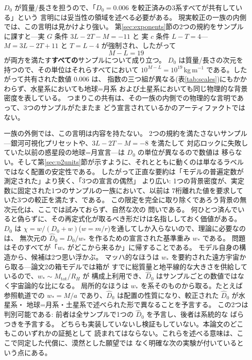 \documentclass[a4paper,10pt,twocolumn]{ltjsarticle}
\begin{document}
$D_0$ が質量/長さを担うので、「$D_0=0.006$ を較正済みの3系すべてが共有している」という
言明には妥当性の領域を述べる必要がある。
現実較正の一族の内側では、この言明は見かけより強い。
第\ref{sec:exponents}節の2つの規約をサンプルに課すと---実 $G$ 条件 $3L-2T-M=-11$ と
実 $c$ 条件 $L-T=4$---$M=3L-2T+11$ と $T=L-4$ が強制され、したがって
\begin{equation}
  M-L = 19
  \label{eq:ML}
\end{equation}
が両方を満たす\textbf{すべての}サンプルについて成り立つ。
$D_0$ は質量/長さの次元を持つので、その単位はそれらすべてにおいて
$10^{M-L}=10^{19}$\,kg\,m$^{-1}$ である。したがって共有された数値 $0.006$ は、
指数の三つ組が異なる(表\ref{tab:scales})にもかかわらず、水星系においても地球=月系
および土星系においても同じ物理的な背景密度を表している。
つまりこの共有は、その一族の内側での物理的な言明であって、3つのサンプルがたまたま
どう宣言されているかのアーティファクトではない。

一族の外側では、この言明は内容を持たない。
2つの規約を満たさないサンプル---銀河可視化プリセットや、$3L-2T-M=-8$ を満たして
対応ロックに失敗していた以前の惑星段の地球=月宣言---は $D_0$ の単位が異なるので数値は
移らない。そして第\ref{sec:p2units}節が示すように、それとともに動くのは単なるラベル
ではなく配置の安定性である。
したがって正直な要約は「モデルの普遍定数が測定された」より狭く、「3つの宣言の偶然」
より広い: 1つの背景密度が、実定数に固定された1つのサンプルの一族において、以前は
7桁離れた値を要求していた3つの較正を満たす、である。
この限定を完全に取り除くであろう背景の無次元化は、ここでは試みておらず、自然な次の
問いである。
何ひとつ済んでいると偽らずに、その再定式化が取るべき形だけは名指ししておく価値がある。
$D_0$ は $\chi=w/(D_0+w)$($w=m/r$)を通してしか入らないので、理論に必要なのは、
無次元の $\hat D_0=D_0/w_{\ast}$ を作るための宣言された基準重み $w_{\ast}$ である。
問題はそのすべてが「$w_{\ast}$ がどこから来るか」に帰することである。
モデル自身の構造から、候補は2つ思い浮かぶ。
マッハ的なほうは $w_{\ast}$ を要約された遠方宇宙から取る---論文2の箱モデルでは箱が
すでに総質量と地平線的な大きさを供給しているので、$w_{\ast}\sim M_{\mathrm{tot}}/R_{H}$ が
構成上利用でき、$\hat D_0$ はサンプルごとの数値ではなく宇宙論的な比になる。
局所的なほうは $w_{\ast}$ を系そのものから取る。たとえば参照軌道での
$w_{\ast}=M/a$ であり、$\hat D_0$ は配置の性質になり、較正された $\hat D_0$ が水星系・
地球=月系・土星系で述べられた形で異なることを予言する。
この2つは判別可能である: 前者は全サンプルで1つの $\hat D_0$ を予言し、後者は系統的な
ばらつきを予言する。
どちらも実装していないし検証もしていない。本論文のどこもこのいずれかの証拠として
読まれてはならない。これらを述べる意味は、ここで同定した代償に、漠然とした願望では
なく明確な次の実験が付いているという点にある。
\end{document}

